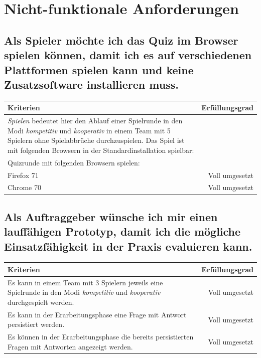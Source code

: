\documentclass[a4paper,11pt,listof=numbered,glossary=totoc,parskip=half,toc=bib]{scrreprt}
\begin{document}
\begin{appendices}
\begin{tabularx}{\textwidth}{Xr}
			\bottomrule
		\end{tabularx}	
		
		\section{Nicht-funktionale Anforderungen}
		
		\subsection{Als Spieler möchte ich das Quiz im Browser spielen können, damit ich es auf verschiedenen
Plattformen spielen kann und keine Zusatzsoftware installieren muss.}
		\begin{tabularx}{\textwidth}{Xr}
			
			Kriterien & Erfüllungsgrad \\
			\midrule
		\textit{Spielen} bedeutet hier den Ablauf einer Spielrunde in den Modi \textit{kompetitiv} und \textit{kooperativ} in einem Team mit 5 Spielern ohne Spielabbrüche durchzuspielen. 	
		Das Spiel ist mit folgenden Browsern in der Standardinstallation spielbar: & \\
		Quizrunde mit folgenden Browsern spielen: & \\
		Firefox 71 & Voll umgesetzt\\
		Chrome 70 & Voll umgesetzt\\
			\bottomrule
		\end{tabularx}	
			
		\subsection{Als Auftraggeber wünsche ich mir einen lauffähigen Prototyp, damit ich die mögliche Einsatzfähigkeit in der Praxis evaluieren kann.}
		\begin{tabularx}{\textwidth}{Xr}
			
			Kriterien & Erfüllungsgrad \\
			\midrule
			Es kann in einem Team mit 3 Spielern jeweils eine Spielrunde in den Modi \textit{kompetitiv} und \textit{kooperativ} durchgespielt werden. & Voll umgesetzt \\
			Es kann in der Erarbeitungsphase eine Frage mit Antwort persistiert werden. & Voll umgesetzt\\
			Es können in der Erarbeitungsphase die bereits persistierten Fragen mit Antworten angezeigt werden. & Voll umgesetzt\\
			

\end{tabularx}
\end{appendices}
\end{document}
